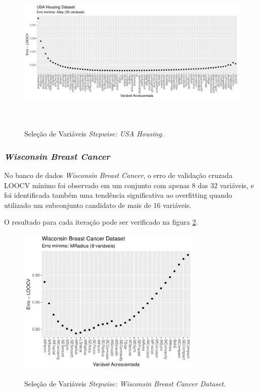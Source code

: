 \begin{figure}[!htb]
    \centering
    \caption{Seleção de Variáveis \textit{Stepwise: USA Housing}.}
    \includegraphics[height=200pt]{imgs/res/USAHousingDataset_validation.pdf}
    \label{fig:stepwise_USAHousingDataset_validation}
\end{figure}

\subsubsection{\textit{Wisconsin Breast Cancer}}

No banco de dados \textit{Wisconsin Breast Cancer}, o erro de validação cruzada LOOCV mínimo foi observado em um conjunto com apenas 8 das 32 variáveis, e foi identificada também uma tendência significativa ao overfitting quando utilizado um subconjunto candidato de mais de 16 variáveis. 

O resultado para cada iteração pode ser verificado na figura \ref{fig:stepwise_WisconsinBreastCancer}.

\begin{figure}[!htb]
    \centering
    \caption{Seleção de Variáveis \textit{Stepwise: Wisconsin Breast Cancer Dataset}.}
    \includegraphics[height=200pt]{imgs/res/WisconsinBreastCancerDataset_validation}
    \label{fig:stepwise_WisconsinBreastCancer}
\end{figure}


